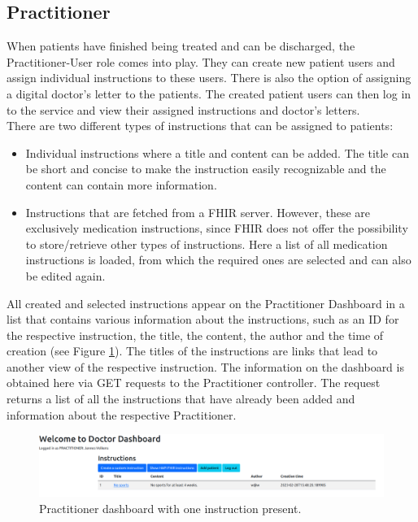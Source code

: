 \documentclass[]{report}
\begin{document}
\subsection{Practitioner}
When patients have finished being treated and can be discharged, the Practitioner-User role comes into play. They can create new patient users and assign individual instructions to these users. There is also the option of assigning a digital doctor's letter to the patients. The created patient users can then log in to the service and view their assigned instructions and doctor's letters.\\
There are two different types of instructions that can be assigned to patients:\\
\begin{itemize}
    \item Individual instructions where a title and content can be added. The title can be short and concise to make the instruction easily recognizable and the content can contain more information.
    \item Instructions that are fetched from a FHIR server. However, these are exclusively medication instructions, since FHIR does not offer the possibility to store/retrieve other types of instructions. Here a list of all medication instructions is loaded, from which the required ones are selected and can also be edited again.
\end{itemize}
All created and selected instructions appear on the Practitioner Dashboard in a list that contains various information about the instructions, such as an ID for the respective instruction, the title, the content, the author and the time of creation (see Figure \ref{fig:practitioner_dashboard}). The titles of the instructions are links that lead to another view of the respective instruction. The information on the dashboard is obtained here via GET requests to the Practitioner controller. The request returns a list of all the instructions that have already been added and information about the respective Practitioner.\\
\begin{figure}[h]
    \centering
    \includegraphics[width=1\textwidth]{Practitioner_Dashboard.png}
    \caption{Practitioner dashboard with one instruction present.}
    \label{fig:practitioner_dashboard}
\end{figure}
\end{document}
